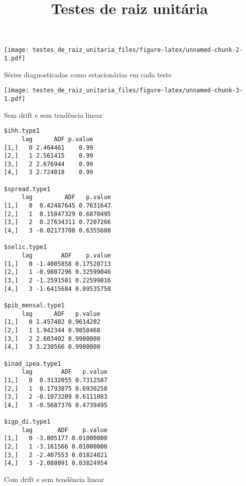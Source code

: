 \documentclass[]{article}
\title{Testes de raiz unitária}
\author{}
\date{}
\begin{document}
\maketitle

\texttt{[image: testes\_de\_raiz\_unitaria\_files/figure-latex/unnamed-chunk-2-1.pdf]}

\newpage

\begin{center}\LARGE{Séries diagnosticadas como estacionárias em cada teste}\end{center}

\texttt{[image: testes\_de\_raiz\_unitaria\_files/figure-latex/unnamed-chunk-3-1.pdf]}

\newpage

\large{Sem drift e sem tendência linear}

\begin{verbatim}
$ihh.type1
     lag      ADF p.value
[1,]   0 2.464461    0.99
[2,]   1 2.561415    0.99
[3,]   2 2.676944    0.99
[4,]   3 2.724018    0.99

$spread.type1
     lag         ADF   p.value
[1,]   0  0.42487645 0.7631647
[2,]   1  0.15847329 0.6870495
[3,]   2  0.27634311 0.7207266
[4,]   3 -0.02173708 0.6355608

$selic.type1
     lag        ADF    p.value
[1,]   0 -1.4005858 0.17520713
[2,]   1 -0.9807296 0.32599046
[3,]   2 -1.2591581 0.22599816
[4,]   3 -1.6415684 0.09535758

$pib_mensal.type1
     lag      ADF   p.value
[1,]   0 1.457482 0.9614202
[2,]   1 1.942344 0.9858468
[3,]   2 2.603402 0.9900000
[4,]   3 3.230566 0.9900000

$inad_ipea.type1
     lag        ADF   p.value
[1,]   0  0.3132055 0.7312587
[2,]   1  0.1793875 0.6930250
[3,]   2 -0.1073209 0.6111083
[4,]   3 -0.5687376 0.4739495

$igp_di.type1
     lag       ADF    p.value
[1,]   0 -3.805177 0.01000000
[2,]   1 -3.161566 0.01000000
[3,]   2 -2.407553 0.01824821
[4,]   3 -2.088091 0.03824954
\end{verbatim}

\newpage

\large{Com drift e sem tendência linear}
\end{document}
